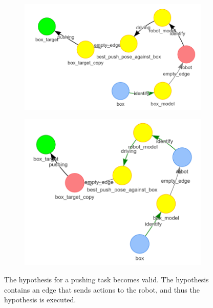 \begin{figure}[H]
    \centering
    \begin{subfigure}{.3\textwidth}
    \centering
    \includegraphics[width=1\textwidth]{figures/proposed_method/connecting_nodes/robot_push/robot_push_4_new}
    \caption{}\label{subfig:robot_push_4}
    \end{subfigure}
    \begin{subfigure}{.3\textwidth}
    \centering
    \includegraphics[width=1\textwidth]{figures/proposed_method/connecting_nodes/robot_push/robot_push_5_new}
    \caption{}\label{subfig:robot_push_5}
    \end{subfigure}
    \caption{The hypothesis for a pushing task becomes valid. The hypothesis contains an edge that sends actions to the robot, and thus the hypothesis is executed.}%
    \label{fig:robot_push_2}
\end{figure}

